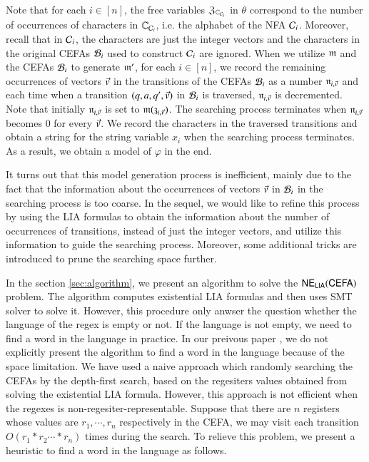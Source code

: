 Note that for each $i \in [n]$, the free variables $\mathfrak{Z}_{\mathbb{C}_{\mathcal{C}_i}}$ in $\theta$ correspond to the number of occurrences of characters in $\mathbb{C}_{\mathcal{C}_i}$, i.e. the alphabet of the NFA $\mathcal{C}_i$. Moreover, recall that in $\mathcal{C}_i$, the characters are just the integer vectors and the characters in the original CEFAs $\mathcal{B}_i$ used to construct $\mathcal{C}_i$ are ignored. 
When we utilize $\mathfrak{m}$ and the CEFAs $\mathcal{B}_i$ to generate $\mathfrak{m}'$, for each $i \in [n]$, we record the remaining occurrences of vectors $\vec{v}$ in the transitions of the CEFAs $\mathcal{B}_i$ as a number $\mathfrak{n}_{i, \vec{v}}$ and
each time when a transition $(q, a, q', \vec{v})$ in $\mathcal{B}_i$ is traversed, $\mathfrak{n}_{i, \vec{v}}$ is decremented. Note that initially $\mathfrak{n}_{i, \vec{v}}$ is set to $\mathfrak{m}(\mathfrak{z}_{i, \vec{v}})$. The searching process terminates when $\mathfrak{n}_{i, \vec{v}}$ becomes $0$ for every $\vec{v}$. We record the characters in the traversed transitions and obtain a string for the string variable $x_i$ when the searching process terminates. As a result, we obtain a model of $\varphi$ in the end. 

It turns out that this model generation process is inefficient, mainly due to the fact that the information about the occurrences of vectors $\vec{v}$ in $\mathcal{B}_i$ in the searching process is too coarse. In the sequel, we would like to refine this process by using the LIA formulas to obtain the information about the number of occurrences of transitions, instead of just the integer vectors, and utilize this information to guide the searching process. Moreover, some additional tricks are introduced to prune the searching space further.  


In the section \ref{sec:algorithm}, we present an algorithm to solve the ${\sf NE_{LIA}(CEFA)}$ problem. The algorithm computes existential LIA formulas and then uses SMT solver to solve it. However, this procedure only anwser the question whether the language of the regex is empty or not. If the language is not empty, we need to find a word in the language in practice. In our preivous paper \cite{Denghang2023}, we do not explicitly present the algorithm to find a word in the language because of the space limitation. We have used a naive approach which randomly searching the CEFAs by the depth-first search, based on the regesiters values obtained from solving the existential LIA formula. However, this approach is not efficient when the regexes is non-regesiter-representable. Suppose that there are $n$ registers whose values are $r_1,\cdots, r_n$ respectively in the CEFA, we may visit each transition $O(r_1*r_2\cdots *r_n)$ times during the search. To relieve this problem, we present a heuristic to find a word in the language as follows.


